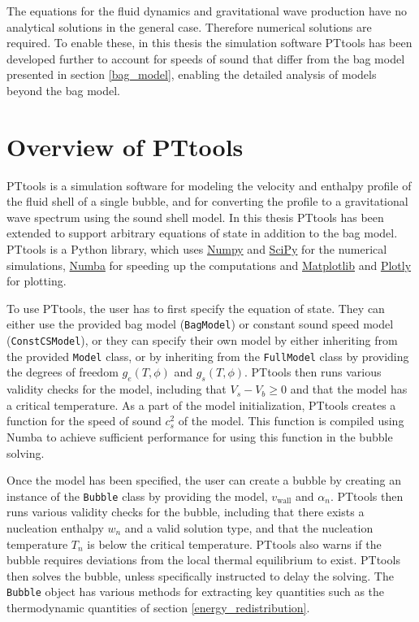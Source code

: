 The equations for the fluid dynamics and gravitational wave production have no analytical solutions in the general case.
Therefore numerical solutions are required.
To enable these, in this thesis the simulation software PTtools has been developed further to account for speeds of sound that differ from the bag model presented in section \ref{bag_model},
enabling the detailed analysis of models beyond the bag model.


\section{Overview of PTtools}
PTtools is a simulation software for modeling the velocity and enthalpy profile of the fluid shell of a single bubble,
and for converting the profile to a gravitational wave spectrum using the sound shell model.
In this thesis PTtools has been extended to support arbitrary equations of state in addition to the bag model.
PTtools is a Python library, which uses
\href{https://numpy.org/}{Numpy}
and
\href{https://scipy.org/}{SciPy}
for the numerical simulations,
\href{https://numba.pydata.org/}{Numba}
for speeding up the computations and
\href{https://matplotlib.org/}{Matplotlib}
and
\href{https://plotly.com/}{Plotly}
for plotting.

To use PTtools, the user has to first specify the equation of state.
They can either use the provided bag model (\texttt{BagModel}) or constant sound speed model (\texttt{ConstCSModel}),
or they can specify their own model by either inheriting from the provided \texttt{Model} class,
or by inheriting from the \texttt{FullModel} class by providing the degrees of freedom $g_e(T,\phi)$ and $g_s(T,\phi)$.
PTtools then runs various validity checks for the model,
including that $V_s - V_b \geq 0$ and that the model has a critical temperature.
As a part of the model initialization, PTtools creates a function for the speed of sound $c_s^2$ of the model.
This function is compiled using Numba to achieve sufficient performance for using this function in the bubble solving.

Once the model has been specified,
the user can create a bubble by creating an instance of the \texttt{Bubble} class by providing the model, $v_\text{wall}$ and $\alpha_n$.
PTtools then runs various validity checks for the bubble,
including that there exists a nucleation enthalpy $w_n$ and a valid solution type,
and that the nucleation temperature $T_n$ is below the critical temperature.
PTtools also warns if the bubble requires deviations from the local thermal equilibrium to exist.
PTtools then solves the bubble, unless specifically instructed to delay the solving.
The \texttt{Bubble} object has various methods for extracting key quantities such as the thermodynamic quantities of section \ref{energy_redistribution}.

